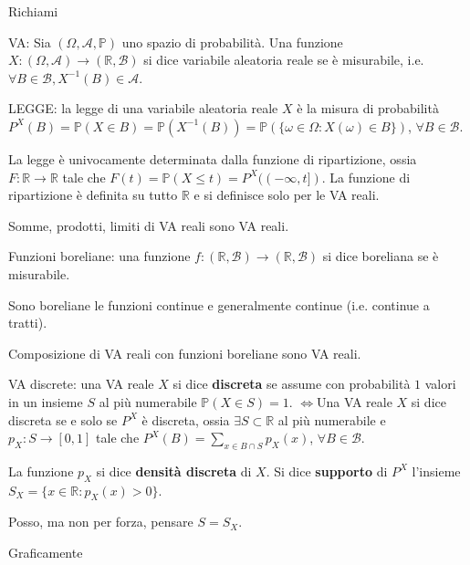 
\ParteEsercizi

Richiami

VA: Sia $( \Omega ,\mathcal{A} ,\mathbb{P})$ uno spazio di probabilità. Una funzione $X:( \Omega ,\mathcal{A})\rightarrow (\mathbb{R} ,\mathcal{B})$ si dice variabile aleatoria reale se è misurabile, i.e. $\forall B\in \mathcal{B} ,X^{-1}( B) \in \mathcal{A}$.

LEGGE: la legge di una variabile aleatoria reale $X$ è la misura di probabilità $P^{X}( B) =\mathbb{P}( X\in B) =\mathbb{P}\left( X^{-1}( B)\right) =\mathbb{P}(\{\omega \in \Omega :X( \omega ) \in B\})$, $\forall B\in \mathcal{B}$.
\begin{oss}
La legge è univocamente determinata dalla funzione di ripartizione, ossia $F:\mathbb{R}\rightarrow \mathbb{R}$ tale che $F( t) =\mathbb{P}( X\leq t) =P^{X}(( -\infty ,t])$. La funzione di ripartizione è definita su tutto $\mathbb{R}$ e si definisce solo per le VA reali.
\end{oss}
\begin{oss}
Somme, prodotti, limiti di VA reali sono VA reali.
\end{oss}
Funzioni boreliane: una funzione $f:(\mathbb{R} ,\mathcal{B})\rightarrow (\mathbb{R} ,\mathcal{B})$ si dice boreliana se è misurabile.
\begin{oss}
Sono boreliane le funzioni continue e generalmente continue (i.e. continue a tratti).
\end{oss}
\begin{oss}
Composizione di VA reali con funzioni boreliane sono VA reali.
\end{oss}
VA discrete: una VA reale $X$ si dice \textbf{discreta} se assume con probabilità $1$ valori in un insieme $S$ al più numerabile $\mathbb{P}( X\in S) =1$. $\iff $Una VA reale $X$ si dice discreta se e solo se $P^{X}$ è discreta, ossia $\exists S\subset \mathbb{R}$ al più numerabile e $p_{X} :S\rightarrow [ 0,1]$ tale che $P^{X}( B) =\sum\limits _{x\in B\cap S} p_{X}( x)$, $\forall B\in \mathcal{B}$.

La funzione $p_{X}$ si dice \textbf{densità discreta} di $X$. Si dice \textbf{supporto} di $P^{X}$ l'insieme $S_{X} =\{x\in \mathbb{R} :p_{X}( x)  >0\}$.
\begin{oss}
Posso, ma non per forza, pensare $S=S_{X}$.
\end{oss}
Graficamente



